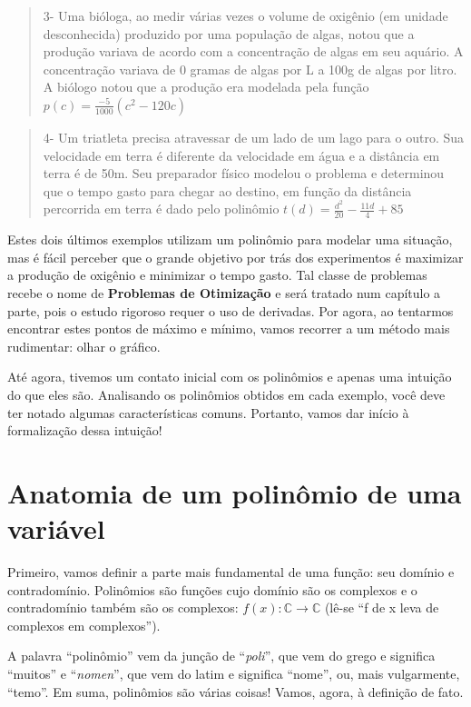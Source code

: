 \documentclass[
  letterpaper,
  DIV=11,
  numbers=noendperiod]{scrreprt}
\begin{document}
\begin{quote}
3- Uma bióloga, ao medir várias vezes o volume de oxigênio (em unidade
desconhecida) produzido por uma população de algas, notou que a produção
variava de acordo com a concentração de algas em seu aquário. A
concentração variava de 0 gramas de algas por L a 100g de algas por
litro. A biólogo notou que a produção era modelada pela função
\(p(c) = \frac{-5}{1000}(c^2-120c)\)
\end{quote}

\begin{quote}
4- Um triatleta precisa atravessar de um lado de um lago para o outro.
Sua velocidade em terra é diferente da velocidade em água e a distância
em terra é de 50m. Seu preparador físico modelou o problema e determinou
que o tempo gasto para chegar ao destino, em função da distância
percorrida em terra é dado pelo polinômio
\(t(d) = \frac{d^2}{20}-\frac{11d}{4}+85\)
\end{quote}

Estes dois últimos exemplos utilizam um polinômio para modelar uma
situação, mas é fácil perceber que o grande objetivo por trás dos
experimentos é maximizar a produção de oxigênio e minimizar o tempo
gasto. Tal classe de problemas recebe o nome de \textbf{Problemas de
Otimização} e será tratado num capítulo a parte, pois o estudo rigoroso
requer o uso de derivadas. Por agora, ao tentarmos encontrar estes
pontos de máximo e mínimo, vamos recorrer a um método mais rudimentar:
olhar o gráfico.

Até agora, tivemos um contato inicial com os polinômios e apenas uma
intuição do que eles são. Analisando os polinômios obtidos em cada
exemplo, você deve ter notado algumas características comuns. Portanto,
vamos dar início à formalização dessa intuição!

\section{Anatomia de um polinômio de uma
variável}\label{anatomia-de-um-polinuxf4mio-de-uma-variuxe1vel}

Primeiro, vamos definir a parte mais fundamental de uma função: seu
domínio e contradomínio. Polinômios são funções cujo domínio são os
complexos e o contradomínio também são os complexos:
\(f(x): \mathbb{C} \to\mathbb{C}\) (lê-se ``f de x leva de complexos em
complexos'').

A palavra ``polinômio'' vem da junção de ``\emph{poli}'', que vem do
grego e significa ``muitos'' e ``\emph{nomen}'', que vem do latim e
significa ``nome'', ou, mais vulgarmente, ``temo''. Em suma, polinômios
são várias coisas! Vamos, agora, à definição de fato.
\end{document}
